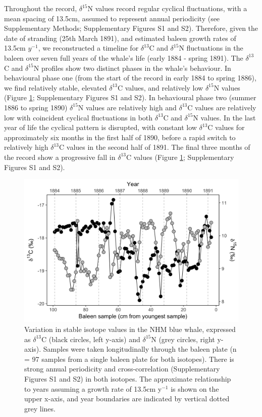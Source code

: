 \documentclass[a4paper,12pt]{article}
\begin{document}
Throughout the record, $\delta^{15}$N values record regular cyclical fluctuations, with a mean spacing of 13.5cm, assumed to represent annual periodicity (see Supplementary Methods; Supplementary Figures S1 and S2). 
Therefore, given the date of stranding (25th March 1891), and estimated baleen growth rates of 13.5cm $y^{-1}$, we reconstructed a timeline for $\delta^{13}$C and $\delta^{15}$N fluctuations in the baleen over seven full years of the whale's life (early 1884 - spring 1891). 
The $\delta^{13}$C and $\delta^{15}$N profiles show two distinct phases in the whale's behaviour. 
In behavioural phase one (from the start of the record in early 1884 to spring 1886), we find relatively stable, elevated $\delta^{13}$C values, and relatively low $\delta^{15}$N values (Figure \ref{fig1}; Supplementary Figures S1 and S2). 
In behavioural phase two (summer 1886 to spring 1890) $\delta^{15}$N values are relatively high and $\delta^{13}$C values are relatively low with coincident cyclical fluctuations in both $\delta^{13}$C and $\delta^{15}$N values. 
In the last year of life the cyclical pattern is disrupted, with constant low $\delta^{13}$C values for approximately six months in the first half of 1890, before a rapid switch to relatively high $\delta^{13}$C values in the second half of 1891. 
The final three months of the record show a progressive fall in $\delta^{13}$C values (Figure \ref{fig1}; Supplementary Figures S1 and S2).

\begin{figure}
  \centering
  \includegraphics[width = \linewidth]{figures/Figure-1-raw-dC-dN-data.png}
  \caption{Variation in stable isotope values in the NHM blue whale, expressed as $\delta^{13}$C (black circles, left y-axis) and $\delta^{15}$N (grey circles, right y-axis). Samples were taken longitudinally through the baleen plate (n = 97 samples from a single baleen plate for both isotopes). There is strong annual periodicity and cross-correlation (Supplementary Figures S1 and S2) in both isotopes. The approximate relationship to years assuming a growth rate of 13.5cm y$^{-1}$ is shown on the upper x-axis, and year boundaries are indicated by vertical dotted grey lines.}
  \label{fig1}
\end{figure}
\end{document}
